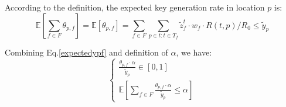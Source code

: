 According to the definition, the expected key generation rate in location $p$ is:
\begin{equation}\label{expectedypf}
  \mathbb{E}[\sum_{f \in F}\theta_{p,f}]= \mathbb{E}[\theta_{p,f}] = \sum_{f \in F}\sum_{p \in t:t \in T_f}\widetilde{z}_f^t \cdot w_f  \cdot R(t,p) / R_0 \le \widetilde{y}_p
\end{equation}

Combining Eq.\ref{expectedypf} and definition of $\alpha$, we have:
\begin{equation}\label{eq:relaxed}
	\begin{cases}
     \frac{\theta_{p,f} \cdot \alpha}{\widetilde{y}_p} \in [0,1] \\
     \mathbb{E}[\sum_{f \in F} \frac{\theta_{p,f} \cdot \alpha}{\widetilde{y}_p} \le \alpha]
	\end{cases}
\end{equation}

